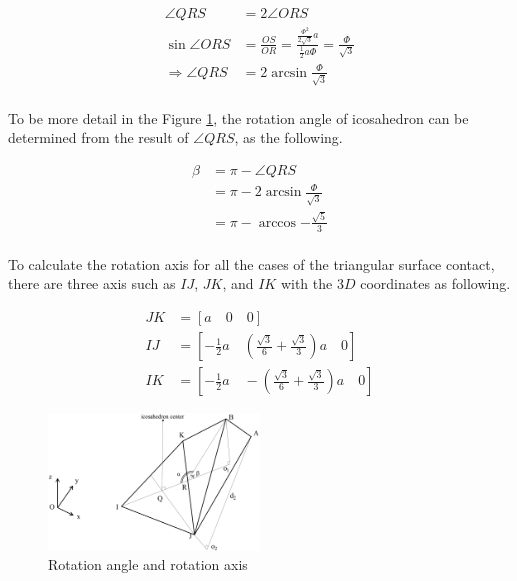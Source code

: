 \begin{equation*} 
\label{icosa:eq2}
\begin{split}
\angle{QRS} & = 2\angle{ORS}\\
\sin{\angle{ORS}} & = \frac{OS}{OR} = \frac{ \frac{\Phi^2}{2\sqrt{3}}a}{\frac{1}{2}a\Phi} = \frac{\Phi}{\sqrt{3}}\\
\Rightarrow \angle{QRS} & =2\arcsin{\frac{\Phi}{\sqrt{3}}}\\
\end{split}
\end{equation*}

\noindent To be more detail in the Figure \ref{fig:icosaGeo5}, the rotation angle of icosahedron can be determined from the result of $\angle{QRS}$, as the following. 

\begin{equation*} 
\label{icosa:eq3}
\begin{split}
\beta & = \pi- \angle{QRS}\\
      & = \pi - 2\arcsin{\frac{\Phi}{\sqrt{3}}}\\
      & = \pi- \arccos{-\frac{\sqrt{5}}{3}}\\
\end{split}
\end{equation*}

\noindent To calculate the rotation axis for all the cases of the triangular surface contact, there are three axis such as $IJ$, $JK$, and $IK$ with the $3D$ coordinates as following.

\begin{align*}
\label{icosa:eq4}
JK & = [a\quad  0\quad  0]\\
IJ & = [-\frac{1}{2}a\quad  (\frac{\sqrt{3}}{6}+\frac{\sqrt{3}}{3})a\quad  0]\\
IK & = [-\frac{1}{2}a\quad  -(\frac{\sqrt{3}}{6}+\frac{\sqrt{3}}{3})a\quad  0]
\end{align*}

\begin{figure}[h]
\centering
	\includegraphics[width=0.5\textwidth]{image/icosaGeo55.png}
	\caption{Rotation angle and rotation axis}
	\label{fig:icosaGeo5}
\end{figure}

